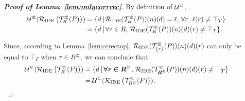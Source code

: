 \begin{proof}[\textbf{Proof of Lemma~\ref{lem:onlycorrrec}}]
  By definition of $\mathcal U^\Subset$,
  \begin{align*}
    \mathcal U^\Subset(\mathcal R_{\text{IDE}}\left(\mathcal T^\Subset_R(P)\right))
    &=\{d\,|\,\mathcal R_{\text{IDE}}(\mathcal T^\Subset_R(P))(n)(d)=\ell,\,\forall r\,.\,\ell(r)\ne\top_T\}\\
    &=\{d\,|\,\forall r\in R,\,\mathcal R_{\text{IDE}}(\mathcal T^\Subset_R(P))(n)(d)(r)\ne\top_T\}.
  \end{align*}
  
Since, according to Lemma~\ref{lem:ccrectop}, $\mathcal R_{\text{IDE}}(\mathcal T^\Subset_{\{r\}}(P))(n)(d)(r)$ can only be equal to $\top_T$ when $r\in{R^\Subset}$, we can conclude that
  \begin{align*}
    \mathcal U^\Subset(\mathcal R_{\text{IDE}}\left(\mathcal T^\Subset_R(P)\right))
    &=\{d\,|\,\bm{\forall r\in{R^\Subset}},\,\mathcal R_{\text{IDE}}(\mathcal T^\Subset_{\bm{{R^\Subset}}}(P))(n)(d)(r)\ne\top_T\}\\
    &=\mathcal U^\Subset(\mathcal R_{\text{IDE}}\left(\mathcal T^\Subset_{R^\Subset}(P)\right)).
    \qedhere
  \end{align*}
\end{proof}
